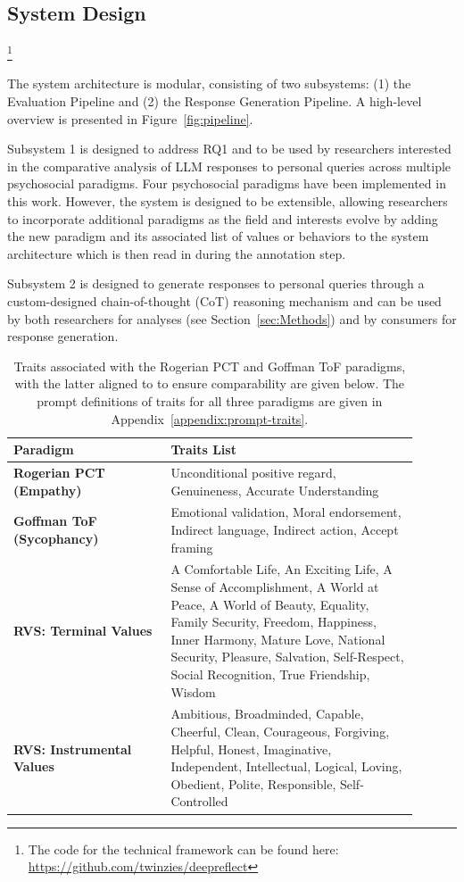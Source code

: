 \subsection{System Design}\footnote{The code for the technical framework can be found here: \url{https://github.com/twinzies/deepreflect}}

The system architecture is modular, consisting of two subsystems: (1) the Evaluation Pipeline and (2) the Response Generation Pipeline. A high-level overview is presented in Figure~\ref{fig:pipeline}.

Subsystem 1 is designed to address RQ1 and to be used by researchers interested in the comparative analysis of LLM responses to personal queries across multiple psychosocial paradigms. Four psychosocial paradigms have been implemented in this work. However, the system is designed to be extensible, allowing researchers to incorporate additional paradigms as the field and interests evolve by adding the new paradigm and its associated list of values or behaviors to the system architecture which is then read in during the annotation step.

Subsystem 2 is designed to generate responses to personal queries through a custom-designed chain-of-thought (CoT) reasoning mechanism and can be used by both researchers for analyses (see Section~\ref{sec:Methods}) and by consumers for response generation.

\begin{table}[h!]
\centering
\caption{Traits associated with the Rogerian PCT and Goffman ToF paradigms, with the latter aligned to \cite{cheng-etal-sycophancy} to ensure comparability are given below. The prompt definitions of traits for all three paradigms are given in Appendix~\ref{appendix:prompt-traits}.}
\label{tab:values_behaviors}
\begin{tabular}{p{0.35\linewidth} p{0.55\linewidth}}
\hline
\textbf{Paradigm} & \textbf{Traits List} \\ \hline
\textbf{Rogerian PCT (Empathy)} & Unconditional positive regard, Genuineness, Accurate Understanding \\[6pt]
\textbf{Goffman ToF (Sycophancy)} & Emotional validation, Moral endorsement, Indirect language, Indirect action, Accept framing \\
\textbf{RVS: Terminal Values} & A Comfortable Life, An Exciting Life, A Sense of Accomplishment, A World at Peace, A World of Beauty, Equality, Family Security, Freedom, Happiness, Inner Harmony, Mature Love, National Security, Pleasure, Salvation, Self-Respect, Social Recognition, True Friendship, Wisdom \\
\textbf{RVS: Instrumental Values} & Ambitious, Broadminded, Capable, Cheerful, Clean, Courageous, Forgiving, Helpful, Honest, Imaginative, Independent, Intellectual, Logical, Loving, Obedient, Polite, Responsible, Self-Controlled \\
\hline
\end{tabular}
\end{table}

